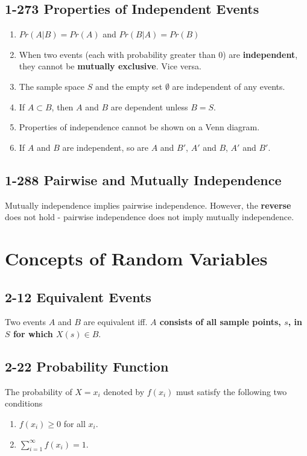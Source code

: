 \documentclass[12pt,landscape]{article}
\begin{document}
\begin{multicols}{3}
    \subsection{1-273 Properties of Independent Events}
    \begin{enumerate}
        \item $Pr(A|B) = Pr(A)$ and $Pr(B|A) = Pr(B)$
        \item When two events (each with probability greater than 0) are \textbf{independent}, they cannot be \textbf{mutually exclusive}. Vice versa.
        \item The sample space $S$ and the empty set $\emptyset$ are independent of any events.
        \item If $A \subset B$, then $A$ and $B$ are dependent unless $B = S$.
        \item Properties of independence cannot be shown on a Venn diagram.
        \item If $A$ and $B$ are independent, so are $A$ and $B'$, $A'$ and $B$, $A'$ and $B'$.
    \end{enumerate}
    
    \subsection{1-288 Pairwise and Mutually Independence}
    Mutually independence implies pairwise independence. However, the \textbf{reverse} does not hold - pairwise independence does not imply mutually independence.
    
    
    \section{Concepts of Random Variables}
    
    \subsection{2-12 Equivalent Events}
    Two events $A$ and $B$ are equivalent iff. \textbf{$A$ consists of all sample points, $s$, in $S$ for which $X(s) \in B$}.
    
    \subsection{2-22 Probability Function}
    \label{2-22}
    The probability of $X = x_i$ denoted by $f(x_i)$ must satisfy the following two conditions
    \begin{enumerate}
        \item $f(x_i) \geq 0$ for all $x_i$.
        \item $\sum_{i = 1}^{\infty} f(x_i) = 1$.
    \end{enumerate}
    

\end{multicols}
\end{document}
